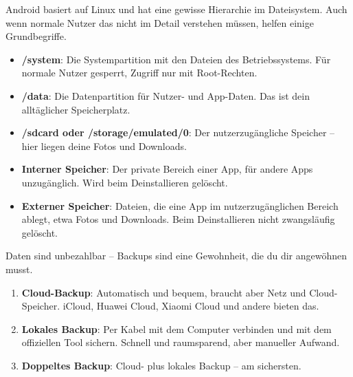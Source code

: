 
Android basiert auf Linux und hat eine gewisse Hierarchie im Dateisystem. Auch wenn normale Nutzer das nicht im Detail verstehen müssen, helfen einige Grundbegriffe.


\begin{itemize}
  \item \textbf{/system}: Die Systempartition mit den Dateien des Betriebssystems. Für normale Nutzer gesperrt, Zugriff nur mit Root-Rechten.
  \item \textbf{/data}: Die Datenpartition für Nutzer- und App-Daten. Das ist dein alltäglicher Speicherplatz.
  \item \textbf{/sdcard oder /storage/emulated/0}: Der nutzerzugängliche Speicher – hier liegen deine Fotos und Downloads.
\end{itemize}


\begin{itemize}
  \item \textbf{Interner Speicher}: Der private Bereich einer App, für andere Apps unzugänglich. Wird beim Deinstallieren gelöscht.
  \item \textbf{Externer Speicher}: Dateien, die eine App im nutzerzugänglichen Bereich ablegt, etwa Fotos und Downloads. Beim Deinstallieren nicht zwangsläufig gelöscht.
\end{itemize}


Daten sind unbezahlbar – Backups sind eine Gewohnheit, die du dir angewöhnen musst.


\begin{enumerate}
  \item \textbf{Cloud-Backup}: Automatisch und bequem, braucht aber Netz und Cloud-Speicher. iCloud, Huawei Cloud, Xiaomi Cloud und andere bieten das.
  \item \textbf{Lokales Backup}: Per Kabel mit dem Computer verbinden und mit dem offiziellen Tool sichern. Schnell und raumsparend, aber manueller Aufwand.
  \item \textbf{Doppeltes Backup}: Cloud- plus lokales Backup – am sichersten.
\end{enumerate}


